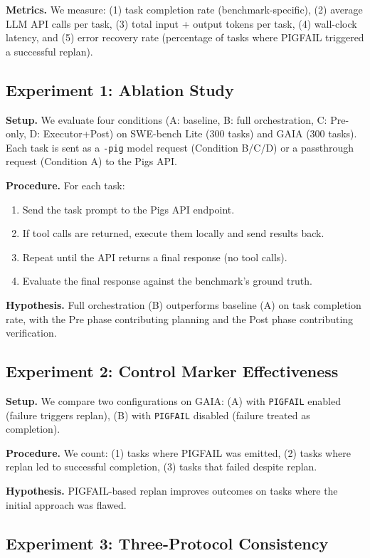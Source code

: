 \textbf{Metrics.} We measure: (1) task completion rate (benchmark-specific), (2) average LLM API calls per task, (3) total input + output tokens per task, (4) wall-clock latency, and (5) error recovery rate (percentage of tasks where PIGFAIL triggered a successful replan).

\subsection{Experiment 1: Ablation Study}

\textbf{Setup.} We evaluate four conditions (A: baseline, B: full orchestration, C: Pre-only, D: Executor+Post) on SWE-bench Lite (300 tasks) and GAIA (300 tasks). Each task is sent as a \texttt{-pig} model request (Condition B/C/D) or a passthrough request (Condition A) to the Pigs API.

\textbf{Procedure.} For each task:
\begin{enumerate}[nosep]
    \item Send the task prompt to the Pigs API endpoint.
    \item If tool calls are returned, execute them locally and send results back.
    \item Repeat until the API returns a final response (no tool calls).
    \item Evaluate the final response against the benchmark's ground truth.
\end{enumerate}

\textbf{Hypothesis.} Full orchestration (B) outperforms baseline (A) on task completion rate, with the Pre phase contributing planning and the Post phase contributing verification.

\subsection{Experiment 2: Control Marker Effectiveness}

\textbf{Setup.} We compare two configurations on GAIA: (A) with \texttt{PIGFAIL} enabled (failure triggers replan), (B) with \texttt{PIGFAIL} disabled (failure treated as completion).

\textbf{Procedure.} We count: (1) tasks where PIGFAIL was emitted, (2) tasks where replan led to successful completion, (3) tasks that failed despite replan.

\textbf{Hypothesis.} PIGFAIL-based replan improves outcomes on tasks where the initial approach was flawed.

\subsection{Experiment 3: Three-Protocol Consistency}

